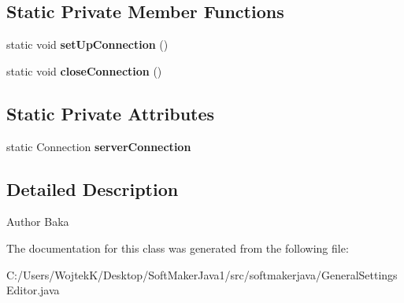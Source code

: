 \subsection*{Static Private Member Functions}
\begin{DoxyCompactItemize}
\item 
static void {\bfseries set\+Up\+Connection} ()\hypertarget{classsoftmakerjava_1_1_general_settings_editor_a584645fd6b751e05b44280b2f16bc5c6}{}\label{classsoftmakerjava_1_1_general_settings_editor_a584645fd6b751e05b44280b2f16bc5c6}

\item 
static void {\bfseries close\+Connection} ()\hypertarget{classsoftmakerjava_1_1_general_settings_editor_a29fed609b53c82a4255ada48c13f6d75}{}\label{classsoftmakerjava_1_1_general_settings_editor_a29fed609b53c82a4255ada48c13f6d75}

\end{DoxyCompactItemize}
\subsection*{Static Private Attributes}
\begin{DoxyCompactItemize}
\item 
static Connection {\bfseries server\+Connection}\hypertarget{classsoftmakerjava_1_1_general_settings_editor_ab4268229813c48546dd946cc9cd5b9cc}{}\label{classsoftmakerjava_1_1_general_settings_editor_ab4268229813c48546dd946cc9cd5b9cc}

\end{DoxyCompactItemize}


\subsection{Detailed Description}
\begin{DoxyAuthor}{Author}
Baka 
\end{DoxyAuthor}


The documentation for this class was generated from the following file\+:\begin{DoxyCompactItemize}
\item 
C\+:/\+Users/\+Wojtek\+K/\+Desktop/\+Soft\+Maker\+Java1/src/softmakerjava/General\+Settings\+Editor.\+java\end{DoxyCompactItemize}
